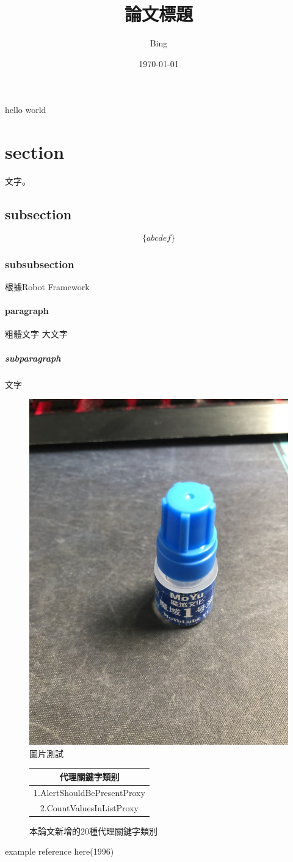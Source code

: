 \documentclass[UTF8]{ctexart}
\title{論文標題}
\author{Bing}
\date{\today}
\begin{document}
\maketitle
hello world

\section{section}
文字。
\subsection{subsection}

\[ \{abcdef\} \]

\subsubsection{subsubsection}
    根據Robot Framework \cite{pa}
\paragraph{paragraph}
    \normalsize\textsf{粗體文字}
    \Large 大文字
    
\subparagraph{subparagraph}
文字
    \begin{figure}[htbp]
    \centering
    \includegraphics[width= .1\textwidth]{test.jpg}
    \caption{圖片測試}
    \end{figure}

    \begin{figure}[htbp]
    \centering
        \begin{tabular}{|c|||}
        \hline
        代理關鍵字類别 \\
        \hline
        1.AlertShouldBePresentProxy \\
        \hline
        2.CountValuesInListProxy \\
        \hline
        \end{tabular}
    \caption{本論文新增的20種代理關鍵字類別}
    \end{figure}

    \begin{thebibliography}{100}
         example reference here(1996)
    \end{thebibliography}
\end{document}
